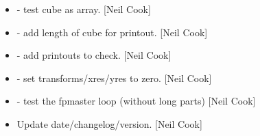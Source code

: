 \documentclass[a4paper,10pt,english]{report}
\begin{document}
\begin{itemize}
\item {} 
 - test cube as array. {[}Neil Cook{]}

\item {} 
 - add length of cube for printout. {[}Neil Cook{]}

\item {} 
 - add printouts to check. {[}Neil Cook{]}

\item {} 
 - set transforms/xres/yres to zero. {[}Neil Cook{]}

\item {} 
 - test the fpmaster loop (without long parts)
{[}Neil Cook{]}

\item {} 
Update date/changelog/version. {[}Neil Cook{]}

\end{itemize}
\end{document}
